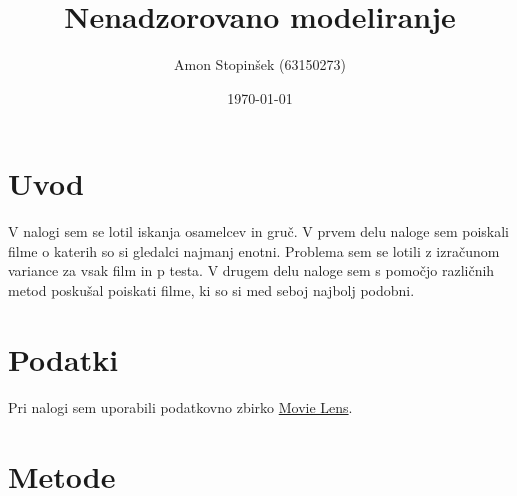 \documentclass[a4paper,11pt]{article}
\title{Nenadzorovano modeliranje}
\author{Amon Stopinšek (63150273)}
\date{\today}
\begin{document}
\maketitle

\section{Uvod}

V nalogi sem se lotil iskanja osamelcev in gruč. V prvem delu naloge sem
poiskali filme o katerih so si gledalci najmanj enotni. Problema sem se lotili
z izračunom variance za vsak film in p testa. V drugem delu naloge sem s pomočjo različnih metod poskušal poiskati filme, ki so si med seboj najbolj podobni.

\section{Podatki}


Pri nalogi sem uporabili podatkovno zbirko
\href{https://grouplens.org/datasets/movielens/}{Movie Lens}.

\section{Metode}

%
%
%
%
\end{document}
